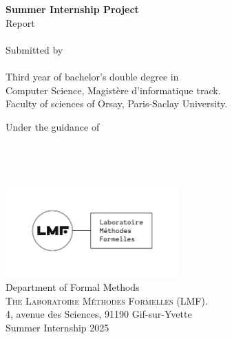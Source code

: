 \begin{titlepage}

\begin{center}

\textup{\small {\bf Summer Internship Project} \\ Report}\\[0.3in]

\Large \textbf {}\\[0.7in]


       

\normalsize Submitted by \\[0.2in]
\\
Third year of bachelor's double degree in \\ Computer Science, Magistère d'informatique track.\\
Faculty of sciences of Orsay, Paris-Saclay University.

\vspace{.2in}
Under the guidance of\\[0.2in]
\\
\\
\\

\vspace{.3in}

\includegraphics[width=0.5\textwidth]{lmf.png}\\[0.1in]
\Large{Department of Formal Methods}\\
\normalsize
\textsc{ The Laboratoire Méthodes Formelles (LMF). }\\
4, avenue des Sciences, 91190 Gif-sur-Yvette \\
\vspace{0.2cm}
Summer Internship 2025

\end{center}

\end{titlepage}
